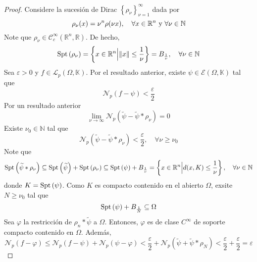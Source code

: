 \documentclass[12pt]{report}
\theoremstyle{largebreak}
\newcommand\norm[1]{\ensuremath{\|#1\|}}
\newcommand{\N}[2]{\ensuremath{\mathcal{N}_{#1}\left(#2\right)}}
\newcommand{\Spt}[1]{\ensuremath{\textup{Spt}\left(#1\right)}}
\begin{document}
\begin{proof}
        Considere la sucesión de Dirac $\left\{\rho_\nu\right\}_{\nu=1}^\infty$ dada por
        \begin{equation*}
            \rho_\nu(x)=\nu^n\rho(\nu x),\quad\forall x\in\mathbb{R}^n\textup{ y }\forall\nu\in\mathbb{N}
        \end{equation*}
        Note que $\rho_\nu\in\mathcal{C}_c^\infty(\mathbb{R}^n,\mathbb{R})$. De hecho,
        \begin{equation*}
            \Spt{\rho_\nu}=\left\{x\in\mathbb{R}^n\Big|\norm{x}\leq\frac{1}{\nu} \right\}=B_{\frac{1}{\nu}},\quad\forall\nu\in\mathbb{N}
        \end{equation*}
        Sea $\varepsilon>0$ y $f\in\mathcal{L}_p(\Omega,\mathbb{K})$. Por el resultado anterior, existe $\psi\in\mathcal{E}(\Omega,\mathbb{K})$ tal que
        \begin{equation*}
            \N{p}{f-\psi}<\frac{\varepsilon}{2}
        \end{equation*}
        Por un resultado anterior
        \begin{equation*}
            \lim_{\nu\rightarrow\infty}\N{p}{\widetilde{\psi}-\widetilde{\psi}*\rho_\nu}=0
        \end{equation*}
        Existe $\nu_0\in\mathbb{N}$ tal que
        \begin{equation*}
            \N{p}{\widetilde{\psi}-\widetilde{\psi}*\rho_{\nu}}<\frac{\varepsilon}{2},\quad\forall \nu\geq\nu_0
        \end{equation*}
        Note que
        \begin{equation*}
            \Spt{\widetilde{\psi}*\rho_\nu}\subseteq\Spt{\widetilde{\psi}}+\Spt{{\rho_\nu}}\subseteq\Spt{\psi}+B_{\frac{1}{\nu}}=\left\{x\in\mathbb{R}^n\Big|d(x,K)\leq\frac{1}{\nu} \right\},\quad\forall\nu\in\mathbb{N}
        \end{equation*}
        donde $K=\Spt{\psi}$. Como $K$ es compacto contenido en el abierto $\Omega$, exsite $N\geq\nu_0$ tal que
        \begin{equation*}
            \Spt{\psi}+B_{\frac{1}{N}}\subseteq\Omega
        \end{equation*}
        Sea $\varphi$ la restricción de $\rho_n*\widetilde{\psi}$ a $\Omega$. Entonces, $\varphi$ es de clase $C^\infty$ de soporte compacto contenido en $\Omega$. Además,
        \begin{equation*}
            \N{p}{f-\varphi}\leq\N{p}{f-\psi}+\N{p}{\psi-\varphi}<\frac{\varepsilon}{2}+\N{p}{\widetilde{\psi}+\widetilde{\psi}*\rho_N}<\frac{\varepsilon}{2}+\frac{\varepsilon}{2}=\varepsilon
        \end{equation*}
    \end{proof}
\end{document}
